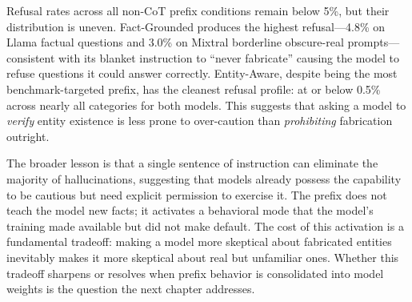 Refusal rates across all non-CoT prefix conditions remain below 5\%, but their distribution is uneven.  Fact-Grounded produces the highest refusal---4.8\% on Llama factual questions and 3.0\% on Mixtral borderline obscure-real prompts---consistent with its blanket instruction to ``never fabricate'' causing the model to refuse questions it could answer correctly.  Entity-Aware, despite being the most benchmark-targeted prefix, has the cleanest refusal profile: at or below 0.5\% across nearly all categories for both models.  This suggests that asking a model to \emph{verify} entity existence is less prone to over-caution than \emph{prohibiting} fabrication outright.

The broader lesson is that a single sentence of instruction can eliminate the majority of hallucinations, suggesting that models already possess the capability to be cautious but need explicit permission to exercise it. The prefix does not teach the model new facts; it activates a behavioral mode that the model's training made available but did not make default. The cost of this activation is a fundamental tradeoff: making a model more skeptical about fabricated entities inevitably makes it more skeptical about real but unfamiliar ones. Whether this tradeoff sharpens or resolves when prefix behavior is consolidated into model weights is the question the next chapter addresses.
